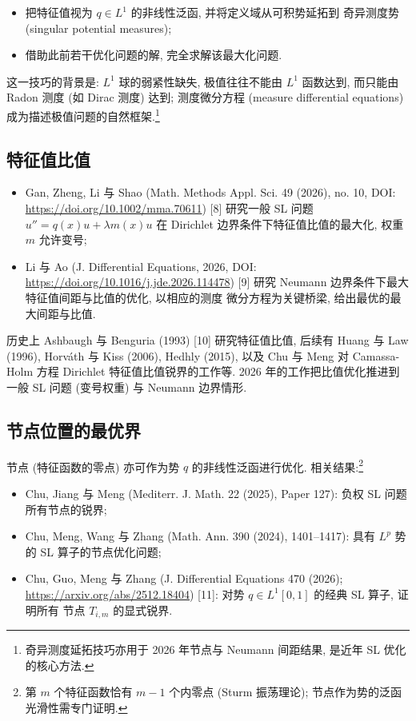 \documentclass[UTF8]{ctexart}
\begin{document}
\begin{itemize}
	\item 把特征值视为 $q \in L^1$ 的非线性泛函, 并将定义域从可积势延拓到
		奇异测度势 (singular potential measures);
	\item 借助此前若干优化问题的解, 完全求解该最大化问题.
\end{itemize}

这一技巧的背景是: $L^1$ 球的弱紧性缺失, 极值往往不能由 $L^1$ 函数达到, 而只能由
Radon 测度 (如 Dirac 测度) 达到; 测度微分方程 (measure differential equations)
成为描述极值问题的自然框架.\footnote{奇异测度延拓技巧亦用于 2026 年节点与 Neumann 间距结果, 是近年 SL 优化的核心方法.}

\subsection{特征值比值}

\begin{itemize}
	\item Gan, Zheng, Li 与 Shao (Math. Methods Appl. Sci. 49 (2026), no. 10,
		DOI: \url{https://doi.org/10.1002/mma.70611}) [8] 研究一般 SL 问题
		$u'' = q(x)u + \lambda m(x)u$ 在 Dirichlet 边界条件下特征值比值的最大化,
		权重 $m$ 允许变号;
\item Li 与 Ao (J. Differential Equations, 2026, DOI: \url{https://doi.org/10.1016/j.jde.2026.114478})
		[9] 研究 Neumann 边界条件下最大特征值间距与比值的优化, 以相应的测度
		微分方程为关键桥梁, 给出最优的最大间距与比值.
\end{itemize}

历史上 Ashbaugh 与 Benguria (1993) [10] 研究特征值比值, 后续有 Huang 与 Law
(1996), Horv\'ath 与 Kiss (2006), Hedhly (2015), 以及 Chu 与 Meng 对 Camassa-Holm
方程 Dirichlet 特征值比值锐界的工作等. 2026 年的工作把比值优化推进到一般 SL 问题
(变号权重) 与 Neumann 边界情形.

\subsection{节点位置的最优界}

节点 (特征函数的零点) 亦可作为势 $q$ 的非线性泛函进行优化. 相关结果:\footnote{第 $m$ 个特征函数恰有 $m-1$ 个内零点 (Sturm 振荡理论); 节点作为势的泛函光滑性需专门证明.}

\begin{itemize}
	\item Chu, Jiang 与 Meng (Mediterr. J. Math. 22 (2025), Paper 127): 负权 SL
		问题所有节点的锐界;
	\item Chu, Meng, Wang 与 Zhang (Math. Ann. 390 (2024), 1401--1417): 具有
		$L^p$ 势的 SL 算子的节点优化问题;
	\item Chu, Guo, Meng 与 Zhang (J. Differential Equations 470 (2026);
		\url{https://arxiv.org/abs/2512.18404}) [11]: 对势 $q \in L^1[0,1]$ 的经典 SL 算子, 证明所有
		节点 $T_{i,m}$ 的显式锐界.
\end{itemize}
\end{document}

